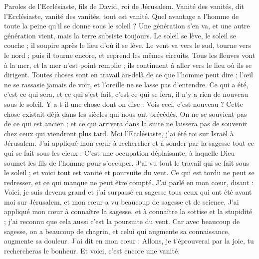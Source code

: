 \begin{multicols}{2}
\VerseOne{}Paroles de l'Ecclésiaste, fils de David, roi de Jérusalem.
Vanité des vanités, dit l'Ecclésiaste, vanité des vanités, tout est vanité.
Quel avantage a l'homme de toute la peine qu’il se donne sous le soleil ?
Une génération s’en va, et une autre génération vient, mais la terre subsiste toujours.
Le soleil se lève, le soleil se couche ; il soupire après le lieu d'où il se lève.
Le vent va vers le sud, tourne vers le nord ; puis il tourne encore, et reprend les mêmes circuits.
Tous les fleuves vont à la mer, et la mer n’est point remplie ; ils continuent à aller vers le lieu où ils se dirigent.
Toutes choses sont en travail au-delà de ce que l'homme peut dire ; l'œil ne se rassasie jamais de voir, et l'oreille ne se lasse pas d'entendre.
Ce qui a été, c'est ce qui sera, et ce qui s’est fait, c’est ce qui se fera, il n'y a rien de nouveau sous le soleil.
Y a-t-il une chose dont on dise : Vois ceci, c’est nouveau ? Cette chose existait déjà dans les siècles qui nous ont précédés.
On ne se souvient pas de ce qui est ancien ; et ce qui arrivera dans la suite ne laissera pas de souvenir chez ceux qui viendront plus tard.
Moi l'Ecclésiaste, j'ai été roi sur Israël à Jérusalem.
J'ai appliqué mon cœur à rechercher et à sonder par la sagesse tout ce qui se fait sous les cieux : C’est une occupation déplaisante, à laquelle Dieu soumet les fils de l’homme pour s’occuper.
J'ai vu tout le travail qui se fait sous le soleil ; et voici tout est vanité et poursuite du vent.
Ce qui est tordu ne peut se redresser, et ce qui manque ne peut être compté.
J'ai parlé en mon cœur, disant : Voici, je suis devenu grand et j’ai surpassé en sagesse tous ceux qui ont été avant moi sur Jérusalem, et mon cœur a vu beaucoup de sagesse et de science.
J'ai appliqué mon cœur à connaître la sagesse, et à connaître la sottise et la stupidité ; j'ai reconnu que cela aussi c’est la poursuite du vent.
Car avec beaucoup de sagesse, on a beaucoup de chagrin, et celui qui augmente sa connaissance, augmente sa douleur.
\VerseOne{}J'ai dit en mon cœur : Allons, je t'éprouverai par la joie, tu rechercheras le bonheur. Et voici, c’est encore une vanité.

\end{multicols}
